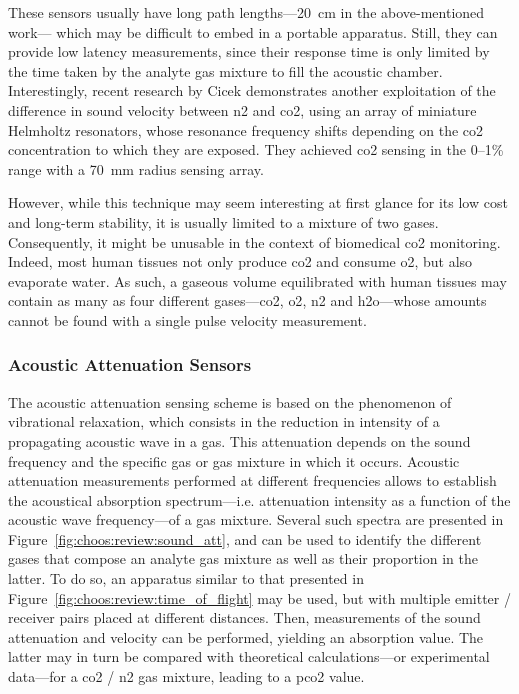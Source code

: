 These sensors usually have long path lengths---20~cm in the above-mentioned work\cite{joos1993}--- which may be difficult to embed in a portable apparatus. Still, they can provide low latency measurements, since their response time is only limited by the time taken by the analyte gas mixture to fill the acoustic chamber. Interestingly, recent research by Cicek \etal{}\cite{cicek2019} demonstrates another exploitation of the difference in sound velocity between \gls{n2} and \gls{co2}, using an array of miniature Helmholtz resonators, whose resonance frequency shifts depending on the \gls{co2} concentration to which they are exposed. They achieved \gls{co2} sensing in the 0--1\% range with a 70~mm radius sensing array.

However, while this technique may seem interesting at first glance for its low cost and long-term stability, it is usually limited to a mixture of two gases\cite{gerlach2019_ch9}. Consequently, it might be unusable in the context of biomedical \gls{co2} monitoring. Indeed, most human tissues not only produce \gls{co2} and consume \gls{o2}, but also evaporate water. As such, a gaseous volume equilibrated with human tissues may contain as many as four different gases---\gls{co2}, \gls{o2}, \gls{n2} and \gls{h2o}---whose amounts cannot be found with a single pulse velocity measurement.

\subsubsection{Acoustic Attenuation Sensors}\label{subsect:choos:review:acoust_att}

The acoustic attenuation sensing scheme is based on the phenomenon of vibrational relaxation, which consists in the reduction in intensity of a propagating acoustic wave in a gas. This attenuation depends on the sound frequency and the specific gas or gas mixture in which it occurs\cite{evans1972, bass1990}. Acoustic attenuation measurements performed at different frequencies allows to establish the acoustical absorption spectrum---i.e. attenuation intensity as a function of the acoustic wave frequency---of a gas mixture. Several such spectra are presented in Figure~\ref{fig:choos:review:sound_att}, and can be used to identify the different gases that compose an analyte gas mixture as well as their proportion in the latter. To do so, an apparatus similar to that presented in Figure~\ref{fig:choos:review:time_of_flight} may be used, but with multiple emitter / receiver pairs placed at different distances. Then, measurements of the sound attenuation and velocity can be performed, yielding an absorption value. The latter may in turn be compared with theoretical calculations---or experimental data---for a \gls{co2} / \gls{n2} gas mixture, leading to a \gls{pco2} value.

